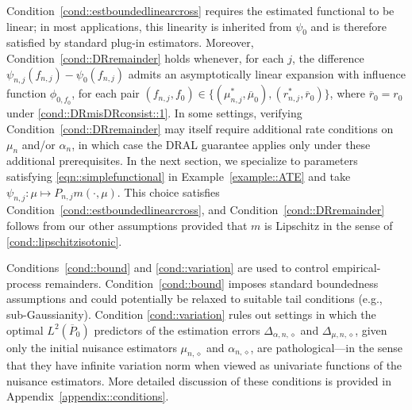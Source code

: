 \documentclass[11pt]{article}
\theoremstyle{plain}
\begin{document}
{\color{purple}
Condition~\ref{cond::estboundedlinearcross} requires the estimated functional to
be linear; in most applications, this linearity is inherited from \(\psi_0\)
and is therefore satisfied by standard plug-in estimators. Moreover,
Condition~\ref{cond::DRremainder} holds whenever, for each \(j\), the difference
\(\psi_{n,j}(f_{n,j})-\psi_0(f_{n,j})\) admits an asymptotically linear expansion
with influence function \(\phi_{0,f_0}\), for each pair
\((f_{n,j},f_0)\in\{(\mu_{n,j}^*,\overline{\mu}_0),(r_{n,j}^*,\overline{r}_0)\}\),
where \(\overline{r}_0=r_0\) under \ref{cond::DRmisDRconsist::1}. In some
settings, verifying Condition~\ref{cond::DRremainder} may itself require
additional rate conditions on \(\mu_n\) and/or \(\alpha_n\), in which case the DRAL guarantee applies only under these
additional prerequisites. In the next section, we specialize to parameters satisfying \eqref{eqn::simplefunctional}
in Example~\ref{example::ATE} and take \(\psi_{n,j}:\mu \mapsto P_{n,j} m(\cdot,\mu)\).
This choice satisfies Condition~\ref{cond::estboundedlinearcross}, and
Condition~\ref{cond::DRremainder} follows from our other assumptions provided that \(m\)
is Lipschitz in the sense of \ref{cond::lipschitzisotonic}.

Conditions~\ref{cond::bound} and \ref{cond::variation} are used to control
empirical-process remainders. Condition~\ref{cond::bound} imposes standard
boundedness assumptions and could potentially be relaxed to suitable tail
conditions (e.g., sub-Gaussianity). Condition \ref{cond::variation} rules out settings in which the optimal
\(L^2(\overline{P}_0)\) predictors of the estimation errors
\(\Delta_{\alpha,n,\diamond}\) and \(\Delta_{\mu,n,\diamond}\), given only the
initial nuisance estimators \(\mu_{n,\diamond}\) and \(\alpha_{n,\diamond}\), are
pathological---in the sense that they have infinite variation norm when viewed
as univariate functions of the nuisance estimators. More detailed discussion of
these conditions is provided in Appendix~\ref{appendix::conditions}.}
\end{document}
